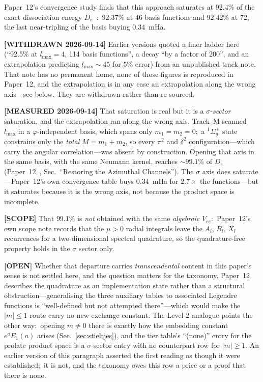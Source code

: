 \documentclass[aps,pra,twocolumn,superscriptaddress,longbibliography]{revtex4-2}
\begin{document}
Paper~12's convergence study finds that this approach saturates at
$92.4\%$ of the exact dissociation energy $D_e$~\cite{loutey_paper12}:\
$92.37\%$ at 46 basis functions and $92.42\%$ at 72, the last near-tripling
of the basis buying $0.34$~mHa.

\textbf{[WITHDRAWN 2026-09-14]} Earlier versions quoted a finer ladder here
(``92.5\% at $l_{\max}=4$, 114 basis functions'', a decay ``by a factor of
200'', and an extrapolation predicting $l_{\max}\sim45$ for $5\%$ error)
from an unpublished track note.  That note has no permanent home, none of
those figures is reproduced in Paper~12, and the extrapolation is in any
case an extrapolation along the wrong axis---see below.  They are withdrawn
rather than re-sourced.

\textbf{[MEASURED 2026-09-14]} That saturation is real but it is a
$\sigma$-\emph{sector} saturation, and the extrapolation ran along the
wrong axis.  Track~M scanned $l_{\max}$ in a $\varphi$-independent basis,
which spans only $m_1 = m_2 = 0$;\ a $^1\Sigma_g^+$ state constrains only
the \emph{total} $M = m_1 + m_2$, so every $\pi^2$ and $\delta^2$
configuration---which carry the angular correlation---was absent by
construction.  Opening that axis in the same basis, with the same
Neumann kernel, reaches ${\sim}99.1\%$ of $D_e$
(Paper~12~\cite{loutey_paper12}, Sec.~``Restoring the Azimuthal
Channels'').  The $\sigma$ axis does saturate---Paper~12's own
convergence table buys $0.34$~mHa for $2.7\times$ the functions---but it
saturates because it is the wrong axis, not because the product space is
incomplete.

\textbf{[SCOPE]} That $99.1\%$ is \emph{not} obtained with the same
\emph{algebraic} $V_{ee}$:\ Paper~12's own scope note records that the
$\mu > 0$ radial integrals leave the $A_l$, $B_l$, $X_l$ recurrences for a
two-dimensional spectral quadrature, so the quadrature-free property holds
in the $\sigma$ sector only.

\textbf{[OPEN]} Whether that departure carries \emph{transcendental} content
in this paper's sense is not settled here, and the question matters for the
taxonomy.  Paper~12 describes the quadrature as an implementation state
rather than a structural obstruction---generalising the three auxiliary
tables to associated Legendre functions is ``well-defined but not attempted
there''---which would make the $|m|\le1$ route carry no new exchange
constant.  The Level-2 analogue points the other way:\ opening $m \neq 0$
there is exactly how the embedding constant $e^aE_1(a)$ arises
(Sec.~\ref{sec:stieltjes}), and the tier table's ``(none)'' entry for the
prolate product space is a $\sigma$-sector entry with no counterpart row
for $|m| \ge 1$.  An earlier version of this paragraph asserted the first
reading as though it were established;\ it is not, and the taxonomy owes
this row a price or a proof that there is none.
\end{document}
